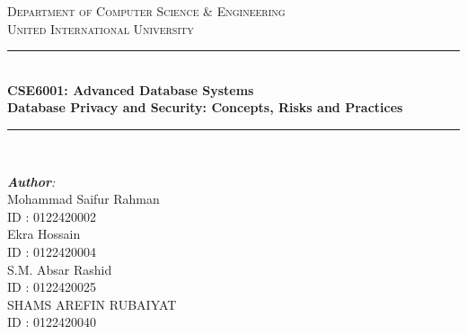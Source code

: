 \documentclass[12pt]{book} %
\begin{document}
\begin{titlepage}

\newcommand{\HRule}{\rule{\linewidth}{0.5mm}} %
\center %
 

\textsc{\Large Department of Computer Science \& Engineering}\\[0.5cm] %
\textsc{\Huge United International University}\\[1cm] %


\HRule \\[0.4cm]
{ \huge \LARGE \textbf{CSE6001: Advanced Database Systems}}\\ [0.4cm] %
{ {\Large \textbf{Database Privacy and Security: Concepts, Risks and Practices}}}\\
\HRule \\ [1cm]


\begin{minipage}{0.5\textwidth}
\begin{flushleft} \small
\emph{\textbf{\large Author}:}\\

Mohammad Saifur Rahman\\
ID : 0122420002\\
Ekra Hossain\\
ID : 0122420004\\
S.M. Absar Rashid\\
ID : 0122420025\\
SHAMS AREFIN RUBAIYAT\\
ID : 0122420040\\





\end{flushleft}
\end{minipage}
\end{titlepage}
\end{document}
